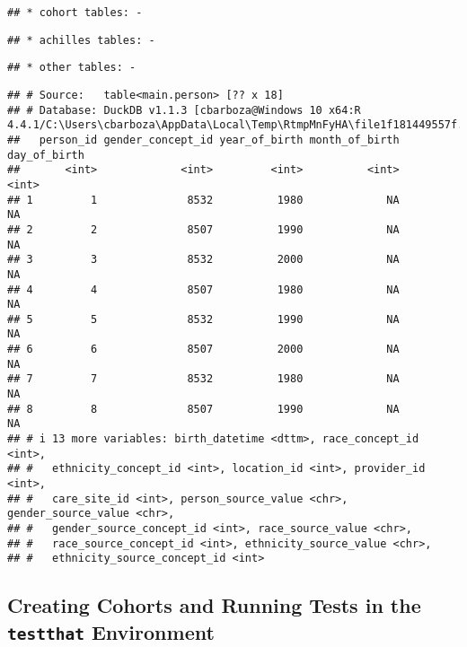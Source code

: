 \documentclass[
]{article}
\newenvironment{Shaded}{\begin{snugshade}}{\end{snugshade}}
\newcommand{\NormalTok}[1]{#1}
\newcommand{\SpecialCharTok}[1]{\textcolor[rgb]{0.81,0.36,0.00}{\textbf{#1}}}
\begin{document}
\begin{verbatim}
## * cohort tables: -
\end{verbatim}

\begin{verbatim}
## * achilles tables: -
\end{verbatim}

\begin{verbatim}
## * other tables: -
\end{verbatim}

\begin{Shaded}
\end{Shaded}

\begin{verbatim}
## # Source:   table<main.person> [?? x 18]
## # Database: DuckDB v1.1.3 [cbarboza@Windows 10 x64:R 4.4.1/C:\Users\cbarboza\AppData\Local\Temp\RtmpMnFyHA\file1f181449557f.duckdb]
##   person_id gender_concept_id year_of_birth month_of_birth day_of_birth
##       <int>             <int>         <int>          <int>        <int>
## 1         1              8532          1980             NA           NA
## 2         2              8507          1990             NA           NA
## 3         3              8532          2000             NA           NA
## 4         4              8507          1980             NA           NA
## 5         5              8532          1990             NA           NA
## 6         6              8507          2000             NA           NA
## 7         7              8532          1980             NA           NA
## 8         8              8507          1990             NA           NA
## # i 13 more variables: birth_datetime <dttm>, race_concept_id <int>,
## #   ethnicity_concept_id <int>, location_id <int>, provider_id <int>,
## #   care_site_id <int>, person_source_value <chr>, gender_source_value <chr>,
## #   gender_source_concept_id <int>, race_source_value <chr>,
## #   race_source_concept_id <int>, ethnicity_source_value <chr>,
## #   ethnicity_source_concept_id <int>
\end{verbatim}

\subsection{\texorpdfstring{Creating Cohorts and Running Tests in the
\texttt{testthat}
Environment}{Creating Cohorts and Running Tests in the testthat Environment}}\label{creating-cohorts-and-running-tests-in-the-testthat-environment}
\end{document}
